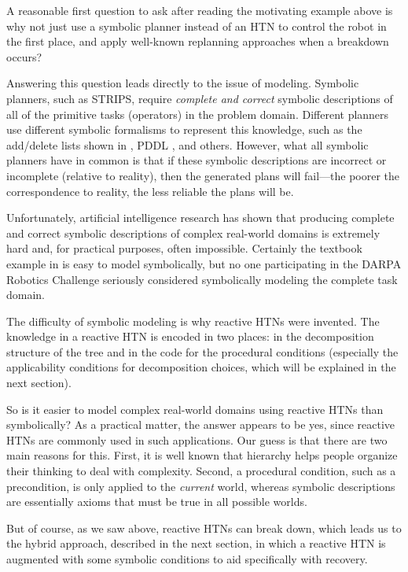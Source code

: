 \documentclass{llncs}
\begin{document}

\noindent A reasonable first question to ask after reading the
motivating example above is why not just use a symbolic planner
instead of an HTN to control the robot in the first place, and apply
well-known replanning approaches when a breakdown occurs?

Answering this question leads directly to the issue of modeling.
Symbolic planners, such as STRIPS, require \emph{complete and correct}
symbolic descriptions of all of the primitive tasks (operators) in the
problem domain.  Different planners use different symbolic formalisms
to represent this knowledge, such as the add/delete lists shown in
, PDDL \cite{PDDL}, and others.  However, what all
symbolic planners have in common is that if these symbolic
descriptions are incorrect or incomplete (relative to reality), then
the generated plans will fail---the poorer the correspondence to
reality, the less reliable the plans will be.

Unfortunately, artificial intelligence research has shown that
producing complete and correct symbolic descriptions of complex
real-world domains is extremely hard and, for practical purposes,
often impossible.  Certainly the textbook example in
 is easy to model symbolically, but no one participating
in the DARPA Robotics Challenge seriously considered symbolically
modeling the complete task domain.  

The difficulty of symbolic modeling is why reactive HTNs were
invented.  The knowledge in a reactive HTN is encoded in two places:
in the decomposition structure of the tree and in the code for the
procedural conditions (especially the applicability conditions for
decomposition choices, which will be explained in the next section).

So is it easier to model complex real-world domains using reactive
HTNs than symbolically?  As a practical matter, the answer appears to
be yes, since reactive HTNs are commonly used in such applications.
Our guess is that there are two main reasons for this.  First, it is
well known that hierarchy helps people organize their thinking to deal
with complexity.  Second, a procedural condition, such as a
precondition, is only applied to the \emph{current} world, whereas
symbolic descriptions are essentially axioms that must be true in all
possible worlds.

But of course, as we saw above, reactive HTNs can break down, which
leads us to the hybrid approach, described in the next section, in
which a reactive HTN is augmented with some symbolic conditions to aid
specifically with recovery.
\end{document}
